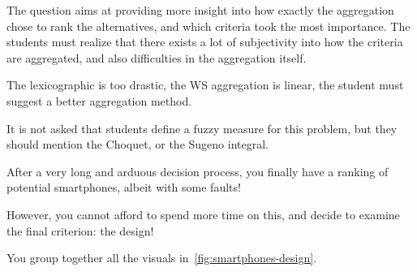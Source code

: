 \documentclass[10pt, UKenglish]{exam}
\begin{document}
\begin{questions}
	
	\begin{comments}
		The question aims at providing more insight into how exactly
		the aggregation chose to rank the alternatives, and which
		criteria took the most importance. The students must realize
		that there exists a lot of subjectivity into how the criteria
		are aggregated, and also difficulties in the aggregation
		itself. 
	\end{comments}
	
	\begin{solutionorbox}
		The lexicographic is too drastic, the WS aggregation is linear,
		the student must suggest a better aggregation method.

		It is not asked that students define a fuzzy measure for this
		problem, but they should mention the Choquet, or the Sugeno
		integral.
	\end{solutionorbox}
	
	\question\label{q:6}%
	After a very long and arduous decision process, you finally have a
	ranking of potential smartphones, albeit with some faults! 

	However, you cannot afford to spend more time on this, and decide to
	examine the final criterion: the design!

	You group together all the visuals in~\cref{fig:smartphones-design}.

\end{questions}
\end{document}
